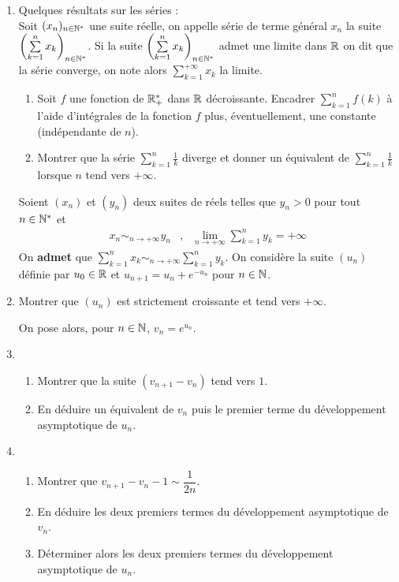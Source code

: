 \begin{enumerate}
\item
Quelques résultats sur les séries :\\
Soit $(x_n)_{n\in\mathbb{N}^*}$ une suite réelle, on appelle série de terme
général $x_n$ la suite
$\left(\sum\limits_{k=1}^nx_k\right)_{n\in\mathbb{N}^*}$. Si la suite
$\left(\sum\limits_{k=1}^nx_k\right)_{n\in\mathbb{N}^*}$ admet une limite
dans $\mathbb{R}$ on dit que la série converge, on note alors
$\sum\limits_{k=1}^{+\infty}x_k$ la limite.

\begin{enumerate}
                   \item Soit $f$ une fonction de $\mathbb{R}_+^*$ dans $\mathbb{R}$
                   décroissante. Encadrer $\sum\limits_{k=1}^n f(k)$
                   à l'aide d'intégrales de la fonction $f$ plus, éventuellement, une constante (indépendante de $n$).
                   \item Montrer que la série  $\sum\limits_{k=1}^n\frac 1k$
                   diverge et donner un équivalent de $\sum\limits_{k=1}^n\frac
                   1k$ lorsque $n$ tend vers $+\infty$.
\end{enumerate}

Soient $(x_n)$ et $(y_n)$ deux suites de réels telles que $y_n>0$ pour tout $n\in\mathbb{N}^*$ et
\begin{align*}
 x_n \sim_{n\to +\infty} y_n  &,& \lim\limits_{n\to +\infty}\sum\limits_{k = 1}^n y_k = + \infty
\end{align*}
On \textbf{admet} que  $\sum\limits_{k = 1}^n x_k \sim_{n\to
+\infty} \sum\limits_{k = 1}^n y_k $. \newline
On considère la suite $(u_n)$ définie par $u_0 \in \mathbb{R}$ et $u_{n + 1}
= u_n + e^{-u_n}$ pour $n\in\mathbb{N}$.

\item Montrer que $(u_n)$ est strictement croissante et tend vers $ + \infty$.

On pose alors, pour $n\in\mathbb{N}$,  $v_n = e^{u_n}$.

\item \begin{enumerate}
        \item Montrer que la suite $(v_{n + 1}-v_n)$ tend vers $1$.
        \item  En déduire un
équivalent de $v_n$ puis le premier terme du développement
asymptotique de $u_n$.
      \end{enumerate}
\item \begin{enumerate}
        \item  Montrer que $v_{n + 1}-v_n-1 \sim \dfrac 1{2n}$.
        \item  En déduire les deux premiers
termes du développement asymptotique de $v_n$.
\item Déterminer alors les deux premiers termes du développement asymptotique de $u_n$.
      \end{enumerate}



\end{enumerate}
